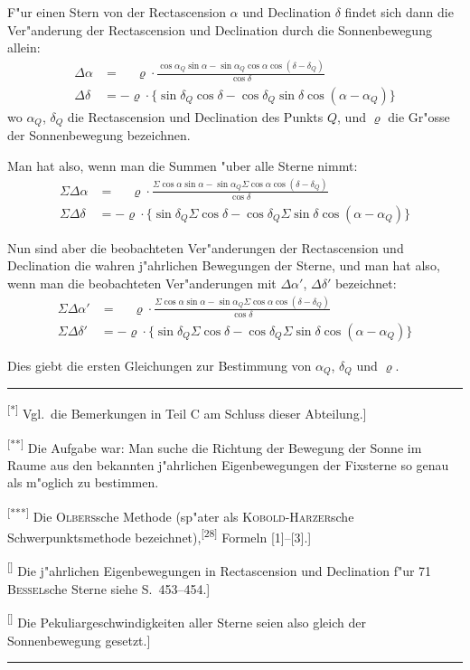 \documentclass[12pt,a4paper]{article}
\theoremstyle{plain}
\theoremstyle{definition}
\theoremstyle{remark}
\begin{document}
F"ur einen Stern von der Rectascension $\alpha$ und Declination $\delta$ findet sich dann die Ver"anderung der Rectascension und Declination durch die Sonnenbewegung allein:
\begin{align*}
\Delta\alpha &= \phantom{+}\varrho \cdot \frac{\cos\alpha_Q \sin\alpha - \sin\alpha_Q \cos\alpha\cos(\delta - \delta_Q)}{\cos\delta}\\
\Delta\delta &= -\varrho \cdot \{\sin\delta_Q \cos\delta - \cos\delta_Q \sin\delta \cos(\alpha - \alpha_Q)\}
\end{align*}
wo $\alpha_Q$, $\delta_Q$ die Rectascension und Declination des Punkts $Q$, und $\varrho$ die Gr"osse der Sonnenbewegung bezeichnen.

Man hat also, wenn man die Summen "uber alle Sterne nimmt:
\begin{align*}
\Sigma\Delta\alpha &= \phantom{+}\varrho \cdot \frac{\Sigma\cos\alpha \sin\alpha - \sin\alpha_Q \Sigma\cos\alpha\cos(\delta - \delta_Q)}{\cos\delta}\\
\Sigma\Delta\delta &= -\varrho \cdot \{\sin\delta_Q \Sigma\cos\delta - \cos\delta_Q \Sigma\sin\delta \cos(\alpha - \alpha_Q)\}
\end{align*}

Nun sind aber die beobachteten Ver"anderungen der Rectascension und Declination die wahren j"ahrlichen Bewegungen der Sterne, und man hat also, wenn man die beobachteten Ver"anderungen mit $\Delta\alpha'$, $\Delta\delta'$ bezeichnet:
\begin{align*}
\Sigma\Delta\alpha' &= \phantom{+}\varrho \cdot \frac{\Sigma\cos\alpha \sin\alpha - \sin\alpha_Q \Sigma\cos\alpha\cos(\delta - \delta_Q)}{\cos\delta}\\
\Sigma\Delta\delta' &= -\varrho \cdot \{\sin\delta_Q \Sigma\cos\delta - \cos\delta_Q \Sigma\sin\delta \cos(\alpha - \alpha_Q)\}
\end{align*}

Dies giebt die ersten Gleichungen zur Bestimmung von $\alpha_Q$, $\delta_Q$ und $\varrho$.

\rule{\textwidth}{0.4pt}
{\small
\textsuperscript{[*]} Vgl.\ die Bemerkungen in Teil C am Schluss dieser Abteilung.]

\textsuperscript{[**]} Die Aufgabe war: Man suche die Richtung der Bewegung der Sonne im Raume aus den bekannten j"ahrlichen Eigenbewegungen der Fixsterne so genau als m"oglich zu bestimmen.

\textsuperscript{[***]} Die \textsc{Olbers}sche Methode (sp"ater als \textsc{Kobold-Harzer}sche Schwerpunktsmethode bezeichnet),\textsuperscript{[28]} Formeln [1]--[3].]

\textsuperscript{[\textdagger]} Die j"ahrlichen Eigenbewegungen in Rectascension und Declination f"ur 71 \textsc{Bessel}sche Sterne siehe S.\ 453--454.]

\textsuperscript{[\textdagger\textdagger]} Die Pekuliargeschwindigkeiten aller Sterne seien also gleich der Sonnenbewegung gesetzt.]
}
\rule{\textwidth}{0.4pt}
\end{document}
